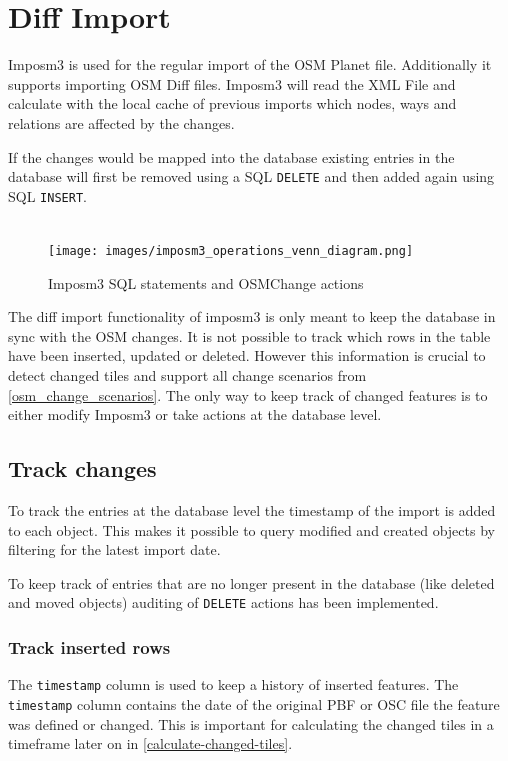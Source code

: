 \section{Diff Import}

Imposm3 is used for the regular import of the OSM Planet file. Additionally it supports importing OSM Diff files. Imposm3 will read the XML File and calculate with the local cache of previous imports which nodes, ways and relations are affected by the changes.

If the changes would be mapped into the database existing entries in the database will first be removed using a SQL \texttt{DELETE} and then added again using SQL \texttt{INSERT}.\\\\

\begin{figure}[H]
  \centering
  \texttt{[image: images/imposm3\_operations\_venn\_diagram.png]}
  \caption{Imposm3 SQL statements and OSMChange actions}
\end{figure}

The diff import functionality of imposm3 is only meant to keep the database in sync with the OSM changes. It is not possible to track which rows in the table have been inserted, updated or deleted. However this information is crucial to detect changed tiles and support all change scenarios from \autoref{osm_change_scenarios}.
The only way to keep track of changed features is to either modify Imposm3 or take actions at the database level.

\subsection{Track changes}

To track the entries at the database level the timestamp of the import is added to each object. This makes it possible to query modified and created objects by filtering for the latest import date.

To keep track of entries that are no longer present in the database (like deleted and moved objects) auditing of \texttt{DELETE} actions has been implemented.

\subsubsection{Track inserted rows}

The \texttt{timestamp} column is used to keep a history of inserted features. The \texttt{timestamp} column contains the date of the original PBF or OSC file the feature was defined or changed. This is important for calculating the changed tiles in a timeframe later on in \autoref{calculate-changed-tiles}.

